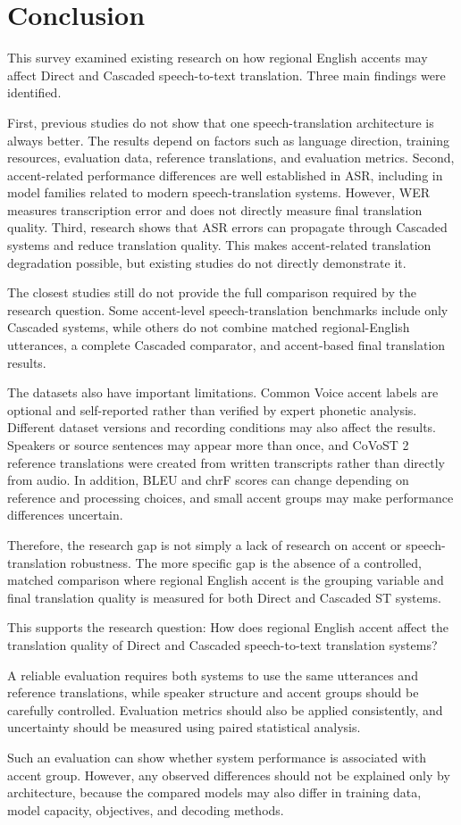 \section{Conclusion}
\label{sec:conclusion}

This survey examined existing research on how regional English accents may
affect Direct and Cascaded speech-to-text translation. Three main findings were
identified.

First, previous studies do not show that one speech-translation architecture is
always better. The results depend on factors such as language direction,
training resources, evaluation data, reference translations, and evaluation
metrics. Second, accent-related performance differences are well established
in ASR, including in model families related to modern speech-translation
systems. However, WER measures transcription error and does not directly
measure final translation quality. Third, research shows that ASR errors can
propagate through Cascaded systems and reduce translation quality. This makes
accent-related translation degradation possible, but existing studies do not
directly demonstrate it.

The closest studies still do not provide the full comparison required by the
research question. Some accent-level speech-translation benchmarks include
only Cascaded systems, while others do not combine matched regional-English
utterances, a complete Cascaded comparator, and accent-based final translation
results.

The datasets also have important limitations. Common Voice accent labels are
optional and self-reported rather than verified by expert phonetic analysis.
Different dataset versions and recording conditions may also affect the
results. Speakers or source sentences may appear more than once, and CoVoST 2
reference translations were created from written transcripts rather than
directly from audio. In addition, BLEU and chrF scores can change depending on
reference and processing choices, and small accent groups may make performance
differences uncertain.

Therefore, the research gap is not simply a lack of research on accent or
speech-translation robustness. The more specific gap is the absence of a
controlled, matched comparison where regional English accent is the
grouping variable and final translation quality is measured for both Direct
and Cascaded ST systems.

This supports the research question: How does regional English accent
affect the translation quality of Direct and Cascaded speech-to-text
translation systems?

A reliable evaluation requires both systems to use the same utterances and
reference translations, while speaker structure and accent groups should be
carefully controlled. Evaluation metrics should also be applied consistently,
and uncertainty should be measured using paired statistical analysis.

Such an evaluation can show whether system performance is associated with
accent group. However, any observed differences should not be explained only
by architecture, because the compared models may also differ in training data,
model capacity, objectives, and decoding methods.
